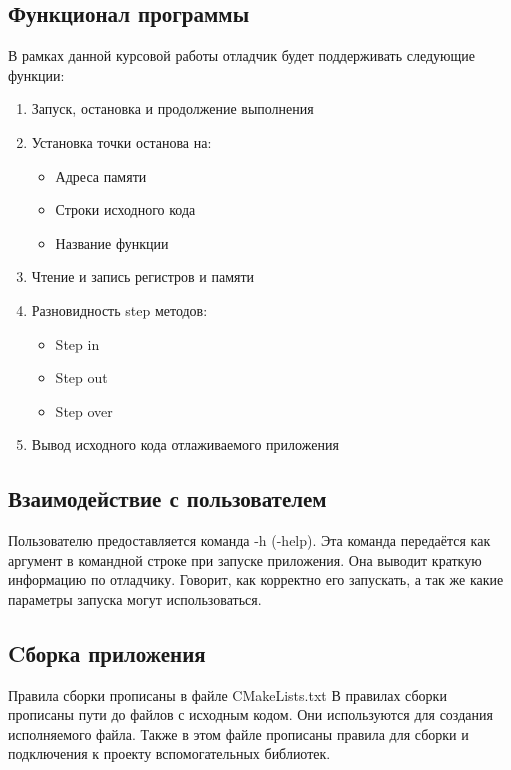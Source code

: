\documentclass[a4paper,14pt,oneside]{extreport}  %
\begin{document}
\subsection{Функционал программы}
В рамках данной курсовой работы отладчик будет поддерживать следующие функции: 
\begin{enumerate}
	\item Запуск, остановка и продолжение выполнения
	\item Установка точки останова на:
	\begin{itemize}
		\item Адреса памяти
		\item Строки исходного кода
		\item Название функции
	\end{itemize}
	\item Чтение и запись регистров и памяти
	\item Разновидность step методов:
	\begin{itemize}
		\item Step in
		\item Step out
		\item Step over
	\end{itemize}
    \item  Вывод исходного кода отлаживаемого приложения
\end{enumerate} 

\subsection{Взаимодействие с пользователем}
Пользователю предоставляется команда -h (-help). Эта команда передаётся как аргумент в командной строке при запуске приложения. Она выводит краткую информацию по отладчику. Говорит, как корректно его запускать, а так же какие параметры запуска могут использоваться.

\subsection{Cборка приложения}
Правила сборки прописаны в файле CMakeLists.txt
В правилах сборки прописаны пути до файлов с исходным кодом. Они используются для создания исполняемого файла.
Также в этом файле прописаны правила для сборки и подключения к проекту вспомогательных библиотек.
\end{document}

